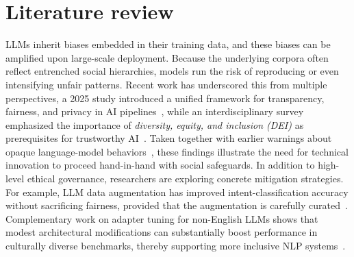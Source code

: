 \documentclass[11pt]{article}
\begin{document}
\section{Literature review}


LLMs inherit biases embedded in their training data, and these biases can be amplified upon large-scale deployment. Because the underlying corpora often reflect entrenched social hierarchies, models run the risk of reproducing or even intensifying unfair patterns. Recent work has underscored this from multiple perspectives, a 2025 study introduced a unified framework for transparency, fairness, and privacy in AI pipelines~\citep{Radanliev2025}, while an interdisciplinary survey emphasized the importance of \emph{diversity, equity, and inclusion (DEI)} as prerequisites for trustworthy AI~\citep{cachat2023diversity}. Taken together with earlier warnings about opaque language-model behaviors~\citep{Bender2021}, these findings illustrate the need for technical innovation to proceed hand-in-hand with social safeguards. In addition to high-level ethical governance, researchers are exploring concrete mitigation strategies. For example, LLM data augmentation has improved intent-classification accuracy without sacrificing fairness, provided that the augmentation is carefully curated~\citep{benayas2024enhancing}. Complementary work on adapter tuning for non-English LLMs shows that modest architectural modifications can substantially boost performance in culturally diverse benchmarks, thereby supporting more inclusive NLP systems~\citep{Zhou2024}.
\end{document}
